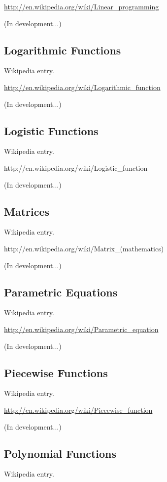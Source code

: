 \documentclass[12pt,twoside]{book}
\begin{document}
\href{http://en.wikipedia.org/wiki/Linear_programming}{http://en.wikipedia.org/wiki/Linear\_programming}

(In development...)

\subsection[Logarithmic Functions]{Logarithmic
Functions}
Wikipedia entry.

\href{http://en.wikipedia.org/wiki/Logarithmic_function}{http://en.wikipedia.org/wiki/Logarithmic\_function}

(In development...)

\subsection[Logistic Functions]{Logistic Functions}
Wikipedia entry.

http://en.wikipedia.org/wiki/Logistic\_function

(In development...)

\subsection[Matrices]{Matrices}
Wikipedia entry.

http://en.wikipedia.org/wiki/Matrix\_(mathematics)

(In development...)

\subsection[Parametric Equations]{Parametric
Equations}
Wikipedia entry.

\href{http://en.wikipedia.org/wiki/Parametric_equation}{http://en.wikipedia.org/wiki/Parametric\_equation}

(In development...)

\subsection[Piecewise Functions]{Piecewise
Functions}
Wikipedia entry.

\href{http://en.wikipedia.org/wiki/Piecewise_function}{http://en.wikipedia.org/wiki/Piecewise\_function}

(In development...)

\subsection[Polynomial Functions]{Polynomial
Functions}
Wikipedia entry.
\end{document}
